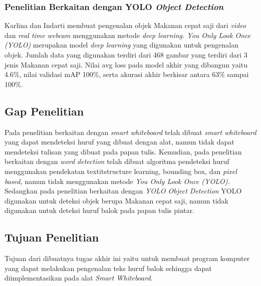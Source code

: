 \subsubsection{Penelitian Berkaitan dengan YOLO \textit{Object Detection}}
Karlina dan Indarti \citep*{karlina2020pengenalan} membuat pengenalan objek Makanan cepat saji dari \textit{video} dan \textit{real time webcam} menggunakan metode \textit{deep learning. You Only Look Once (YOLO)} merupakan model \textit{deep learning} yang digunakan untuk pengenalan objek. Jumlah data yang digunakan terdiri dari 468 gambar yang terdiri dari 3 jenis Makanan cepat saji. Nilai avg loss pada model akhir yang dibangun yaitu 4.6\%, nilai validasi mAP 100\%, serta akurasi akhir berkisar antara 63\% sampai 100\%.

\subsection{Gap Penelitian}
Pada penelitian berkaitan dengan \textit{smart whiteboard} \citep*{kellerman2018smart} telah dibuat \textit{smart whiteboard} yang dapat mendeteksi huruf yang dibuat dengan alat, namun tidak dapat mendeteksi tulisan yang dibuat pada papan tulis. Kemudian, pada penelitian berkaitan dengan \textit{word detection} \citep*{ryu2015word} \citep*{arun2019handwritten} telah dibuat algoritma pendeteksi huruf menggunakan pendekatan textit{structure learning, bounding box,} dan \textit{pixel based,} namun tidak menggunakan metode \textit{You Only Look Once (YOLO).} Sedangkan pada penelitian berkaitan dengan \textit{YOLO Object Detection} \citep*{karlina2020pengenalan} YOLO digunakan untuk deteksi objek berupa Makanan cepat saji, namun tidak digunakan untuk deteksi huruf balok pada papan tulis pintar.

\subsection{Tujuan Penelitian}
Tujuan dari dibuatnya tugas akhir ini yaitu untuk membuat program komputer yang dapat melakukan pengenalan teks huruf balok sehingga dapat diimplementasikan pada alat \textit{Smart Whiteboard.}